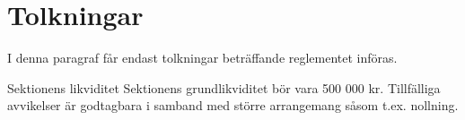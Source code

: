 \documentclass[pdfbookmarks,a4paper,11pt]{article}
\newlength{\itemcollength}
\newenvironment{reglemlista}{%
  \begin{list}{}{%
      \setlength{\labelwidth}{\itemcollength}%
      \setlength{\leftmargin}{\labelwidth + \labelsep}%
      \renewcommand{\makelabel}[1]{%
        \raisebox{0pt}[1ex][0pt]{%
          \makebox[\labelwidth][l]{%
            \parbox[t]{\itemcollength}{%
              \raggedright\hspace{0pt}##1}}}\hfill}%
      }}{%
  \end{list}}
\begin{document}
\section{Tolkningar}

I denna paragraf får endast tolkningar beträffande reglementet införas.

\begin{reglemlista}

	\item[Sektionens likviditet]
	Sektionens grundlikviditet bör vara 500 000 kr. Tillfälliga avvikelser är godtagbara i samband med större arrangemang såsom t.ex. nollning.

\end{reglemlista}
\end{document}
